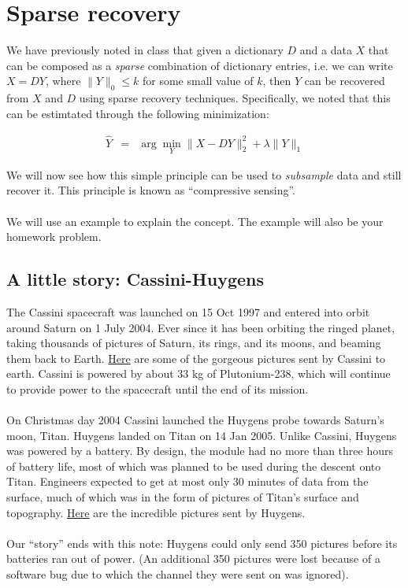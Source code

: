 


\section{Sparse recovery}

We have previously noted in class that given a dictionary $D$ and a data $X$ that can be composed as a \textit{sparse} combination of dictionary entries, i.e. we can write $X = D Y$, where $\|Y\|_0 \leq k$ for some small value of $k$, then $Y$ can be recovered from $X$ and $D$ using sparse recovery techniques. Specifically, we noted that this can be estimtated through the following minimization:

\begin{eqnarray}
\hat{Y} & = & \arg\min_Y \|X - DY\|_2^2 + \lambda \|Y\|_1
\end{eqnarray}

We will now see how this simple principle can be used to \textit{subsample} data and still recover it.  This principle is known as ``compressive sensing''.\\
\\
We will use an example to explain the concept. The example will also be your homework problem.

\subsection*{A little story: Cassini-Huygens}

The Cassini spacecraft was launched on 15 Oct 1997 and entered into orbit around Saturn on 1 July 2004.  Ever since it has been orbiting the ringed planet, taking thousands of pictures of Saturn, its rings, and its moons, and beaming them back to Earth. \href{https://saturn.jpl.nasa.gov/galleries/images/}{ Here} are some of the gorgeous pictures sent by Cassini to earth. Cassini is powered by about 33 kg of Plutonium-238, which will continue to provide power to the spacecraft until the end of its mission.
\\
\\
On Christmas day 2004 Cassini launched the Huygens probe towards Saturn's moon, Titan. Huygens landed on Titan on 14 Jan 2005. Unlike Cassini, Huygens was powered by a battery. By design, the module had no more than three hours of battery life, most of which was planned to be used during the descent onto Titan. Engineers expected to get at most only 30 minutes of data from the surface, much of which was in the form of pictures of Titan's surface and topography. \href{http://esamultimedia.esa.int/docs/titanraw/index.htm}{Here} are the incredible pictures sent by Huygens. 
\\
\\
Our ``story'' ends with this note: Huygens could only send 350 pictures before its batteries ran out of power. (An additional 350 pictures were lost because of a software bug due to which the channel they were sent on was ignored).

